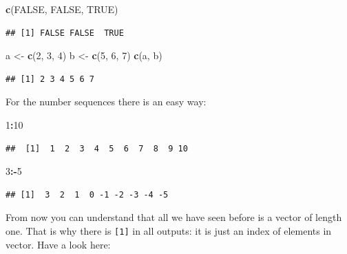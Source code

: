 \documentclass[
]{book}
\newenvironment{Shaded}{\begin{snugshade}}{\end{snugshade}}
\newcommand{\DecValTok}[1]{\textcolor[rgb]{0.00,0.00,0.81}{#1}}
\newcommand{\KeywordTok}[1]{\textcolor[rgb]{0.13,0.29,0.53}{\textbf{#1}}}
\newcommand{\NormalTok}[1]{#1}
\newcommand{\OperatorTok}[1]{\textcolor[rgb]{0.81,0.36,0.00}{\textbf{#1}}}
\newcommand{\OtherTok}[1]{\textcolor[rgb]{0.56,0.35,0.01}{#1}}
\newcommand{\StringTok}[1]{\textcolor[rgb]{0.31,0.60,0.02}{#1}}
\begin{document}
\begin{Shaded}
\begin{Highlighting}[]
\KeywordTok{c}\NormalTok{(}\OtherTok{FALSE}\NormalTok{, }\OtherTok{FALSE}\NormalTok{, }\OtherTok{TRUE}\NormalTok{)}
\end{Highlighting}
\end{Shaded}

\begin{verbatim}
## [1] FALSE FALSE  TRUE
\end{verbatim}

\begin{Shaded}
\begin{Highlighting}[]
\NormalTok{a <-}\StringTok{ }\KeywordTok{c}\NormalTok{(}\DecValTok{2}\NormalTok{, }\DecValTok{3}\NormalTok{, }\DecValTok{4}\NormalTok{)}
\NormalTok{b <-}\StringTok{ }\KeywordTok{c}\NormalTok{(}\DecValTok{5}\NormalTok{, }\DecValTok{6}\NormalTok{, }\DecValTok{7}\NormalTok{)}
\KeywordTok{c}\NormalTok{(a, b)}
\end{Highlighting}
\end{Shaded}

\begin{verbatim}
## [1] 2 3 4 5 6 7
\end{verbatim}

For the number sequences there is an easy way:

\begin{Shaded}
\begin{Highlighting}[]
\DecValTok{1}\OperatorTok{:}\DecValTok{10}
\end{Highlighting}
\end{Shaded}

\begin{verbatim}
##  [1]  1  2  3  4  5  6  7  8  9 10
\end{verbatim}

\begin{Shaded}
\begin{Highlighting}[]
\DecValTok{3}\OperatorTok{:-}\DecValTok{5}
\end{Highlighting}
\end{Shaded}

\begin{verbatim}
## [1]  3  2  1  0 -1 -2 -3 -4 -5
\end{verbatim}

From now you can understand that all we have seen before is a vector of length one. That is why there is \texttt{{[}1{]}} in all outputs: it is just an index of elements in vector. Have a look here:
\end{document}
